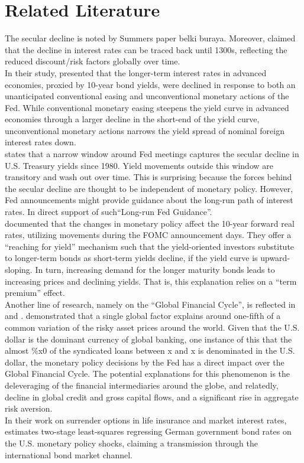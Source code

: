 \section{Related Literature}

The secular decline is noted by Summers paper belki buraya. Moreover, \citet{rogoff2022} claimed that the decline in interest rates can be traced back until 1300s, reflecting the reduced discount/risk factors globally over time. \\

In their study, \citet{gilchrist2014us} presented that the longer-term interest rates in advanced economies, proxied by 10-year bond yields, were declined in response to both an unanticipated conventional easing and unconventional monetary actions of the Fed. While conventional monetary easing steepens the yield curve in advanced economies through a larger decline in the short-end of the yield curve, unconventional monetary actions narrows the yield spread of nominal foreign interest rates down. \\

\citet{hillenbrand2022} states that a narrow window around Fed meetings captures the secular decline in U.S. Treasury yields since 1980. Yield movements outside this window are transitory and wash out over time. This is surprising because the forces behind the secular decline are thought to be independent of monetary policy. However, Fed announcements might provide guidance about the long-run path of interest rates. In direct support of such“Long-run Fed Guidance”. \\

\citet{hanson2015monetary} documented that the changes in monetary policy affect the 10-year forward real rates, utilizing movements during the FOMC announcement days. They offer a ``reaching for yield'' mechanism such that the yield-oriented investors substitute to longer-term bonds as short-term yields decline, if the yield curve is upward-sloping. In turn, increasing demand for the longer maturity bonds leads to increasing prices and declining yields. That is, this explanation relies on a ``term premium'' effect. \citep{hanson2015monetary}\\

Another line of research, namely on the ``Global Financial Cycle'', is reflected in \citet{miranda2020us} and \citet{rey2021}. \citet{miranda2020us} demonstrated that  a single global factor explains around one-fifth of a common variation of the risky asset prices around the world. Given that the U.S. dollar is the dominant currency of global banking, one instance of this that the almost \%x0 of the syndicated loans between x and x is denominated in the U.S. dollar, the monetary policy decisions by the Fed has a direct impact over the Global Financial Cycle. The potential explanations for this phenomenon is the deleveraging of the financial intermediaries around the globe, and relatedly, decline in global credit and gross capital flows, and a significant rise in aggregate risk aversion. \citep{miranda2020us} \\

In their work on surrender options in life insurance and market interest rates, \citet{kubitza2023life} estimates two-stage least-squares regressing German government bond rates on the U.S. monetary policy shocks, claiming a transmission through the international bond market channel.
